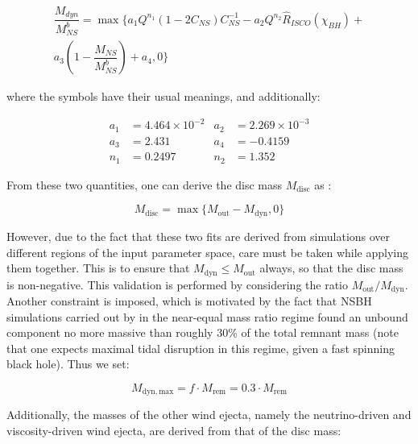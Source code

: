     \begin{multline}
        \dfrac{M_{dyn}}{M_{NS}^b} =
            \max \biggl\{
               a_1 Q^{n_1}(1 - 2C_{NS})C^{-1}_{NS} -
               a_2 Q^{n_2} \hat{R}_{ISCO}(\chi_{BH}) + \\
               a_3\left(1 - \dfrac{M_{NS}}{M^b_{NS}}\right) +
               a_4, 0
           \biggr\}
    \end{multline}

    where the symbols have their usual meanings, and additionally:

    \begin{align*}
        a_1 &= 4.464 \times 10^{-2} & a_2 &= 2.269 \times 10^{-3} \\
        a_3 &= 2.431 & a_4 &= -0.4159 \\
        n_1 &= 0.2497 & n_2 &= 1.352
    \end{align*}

    From these two quantities, one can derive the disc mass $M_{\mathrm{disc}}$ as :

    \begin{equation}
        M_{\mathrm{disc}} = \max\{M_{\mathrm{out}} - M_{\mathrm{dyn}}, 0\}
        \label{eq:disc_mass}
    \end{equation}

    However, due to the fact that these two fits are derived from simulations over
    different regions of the input parameter space, care must be taken while applying
    them together. This is to ensure that $M_{\mathrm{dyn}} \leq M_{\mathrm{out}}$
    always, so that the disc mass is non-negative. This validation is performed by
    considering the ratio $M_{\mathrm{out}} / M_{\mathrm{dyn}}$. Another constraint is
    imposed, which is motivated by the fact that NSBH simulations carried out by
    \cite{foucart_2019} in the near-equal mass ratio regime found an unbound component
    no more massive than roughly 30\% of the total remnant mass (note that one expects
    maximal tidal disruption in this regime, given a fast spinning black hole). Thus we
    set:

    \begin{equation}
        \label{eq:constraint}
        M_{\mathrm{dyn, max}} = f \cdot M_{\mathrm{rem}} = 0.3 \cdot M_{\mathrm{rem}}
    \end{equation}


    Additionally, the masses of the other wind ejecta, namely the neutrino-driven and
    viscosity-driven wind ejecta, are derived from that of the disc mass:

